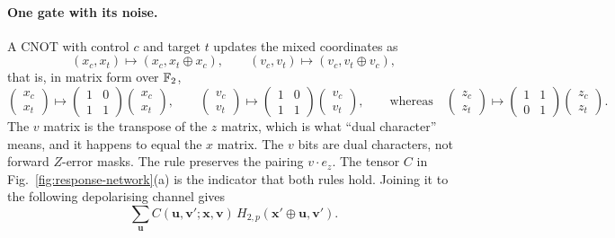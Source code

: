 \paragraph{One gate with its noise.} A CNOT with control $c$ and target $t$ updates the mixed coordinates as
\begin{equation}
 (x_c,x_t)\mapsto(x_c,x_t\oplus x_c),\qquad
 (v_c,v_t)\mapsto(v_c,v_t\oplus v_c),
 \label{eq:mixedCNOT}
\end{equation}
that is, in matrix form over $\mathbb F_2$,
\[
\begin{pmatrix}x_c\\x_t\end{pmatrix}\mapsto\begin{pmatrix}1&0\\1&1\end{pmatrix}\begin{pmatrix}x_c\\x_t\end{pmatrix},\qquad
\begin{pmatrix}v_c\\v_t\end{pmatrix}\mapsto\begin{pmatrix}1&0\\1&1\end{pmatrix}\begin{pmatrix}v_c\\v_t\end{pmatrix},\qquad
\text{whereas}\quad\begin{pmatrix}z_c\\z_t\end{pmatrix}\mapsto\begin{pmatrix}1&1\\0&1\end{pmatrix}\begin{pmatrix}z_c\\z_t\end{pmatrix}.
\]
The $v$ matrix is the transpose of the $z$ matrix, which is what ``dual character'' means, and it happens to equal the $x$ matrix. The $v$ bits are dual characters, not forward $Z$-error masks. The rule preserves the pairing $v\cdot e_z$. The tensor $C$ in Fig.~\ref{fig:response-network}(a) is the indicator that both rules hold. Joining it to the following depolarising channel gives
\begin{equation}
 \sum_{\boldsymbol u}
 C(\boldsymbol u,\boldsymbol v';\boldsymbol x,\boldsymbol v)\,
 H_{2,p}(\boldsymbol x'\oplus\boldsymbol u,\boldsymbol v').
 \label{eq:gate-noise-tensor}
\end{equation}
